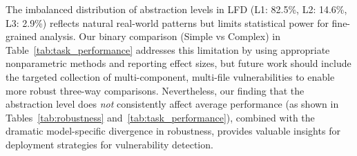 \documentclass[lettersize,journal]{IEEEtran}
\begin{document}
\begin{table}[!t]
    \centering
    \caption{Task-specific accuracy across abstraction levels and L1 $\rightarrow$ L3 change. Excluded abstention cases.}
    \label{tab:task_performance}
    \small
    \renewcommand{\arraystretch}{1.2}
\end{table}


The imbalanced distribution of abstraction levels in LFD (L1: 82.5\%, L2: 14.6\%, L3: 2.9\%) reflects natural real-world patterns but limits statistical power for fine-grained analysis. Our binary comparison (Simple vs Complex) in Table~\ref{tab:task_performance} addresses this limitation by using appropriate nonparametric methods and reporting effect sizes, but future work should include the targeted collection of multi-component, multi-file vulnerabilities to enable more robust three-way comparisons. Nevertheless, our finding that the abstraction level does \textit{not} consistently affect average performance (as shown in Tables~\ref{tab:robustness} and~\ref{tab:task_performance}), combined with the dramatic model-specific divergence in robustness, provides valuable insights for deployment strategies for vulnerability detection.
\end{document}
